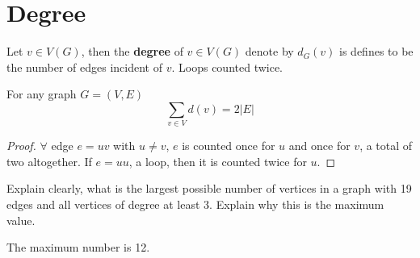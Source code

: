 		\section{Degree}
			\begin{definition}[Degree]
				Let $v\in V(G)$, then the \textbf{degree} of $v\in V(G)$ denote by $d_G(v)$ is defines to be the number of edges incident of $v$. Loops counted twice.
			\end{definition}			

			\begin{theorem}
				For any graph $G=(V, E)$
				\begin{equation}
					\sum_{v\in V}d(v) = 2|E|
				\end{equation}			
			\end{theorem}

			\begin{proof}
				$\forall$ edge $e=uv$ with $u \neq v$, $e$ is counted once for $u$ and once for $v$, a total of two altogether. If $e=uu$, a loop, then it is counted twice for $u$.
			\end{proof}

			\begin{problem}
				Explain clearly, what is the largest possible number of vertices in a graph with 19 edges and all vertices of degree at least 3. Explain why this is the maximum value.
			\end{problem}

			\begin{solution}
				The maximum number is 12.
			\end{solution}

